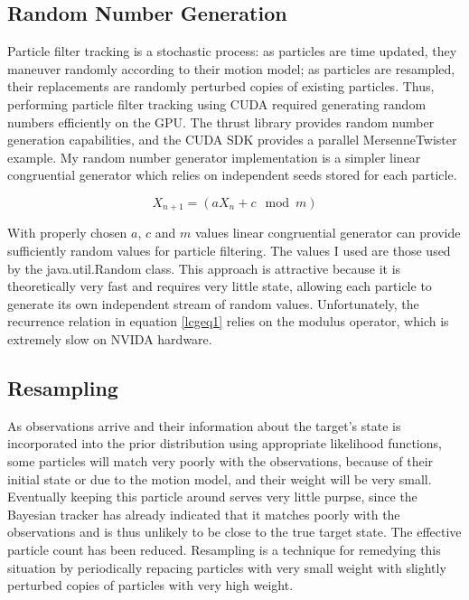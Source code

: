\documentclass{article}
\begin{document}
\subsection{Random Number Generation}
Particle filter tracking is a stochastic process: as particles are time updated, they maneuver randomly according to their motion model; as particles are resampled, their replacements are randomly perturbed copies of existing particles. Thus, performing particle filter tracking using CUDA required generating random numbers efficiently on the GPU. The thrust library provides random number generation capabilities, and the CUDA SDK provides a parallel MersenneTwister example. My random number generator implementation is a simpler linear congruential generator which relies on independent seeds stored for each particle.

\begin{equation}\label{lcgeq1}
X_{n+1}=(aX_{n}+c \mod m)
\end{equation}

With properly chosen \(a\), \(c\) and \(m\) values linear congruential generator can provide sufficiently random values for particle filtering\cite{lcg}. The values I used are those used by the java.util.Random class. This approach is attractive because it is theoretically very fast and requires very little state, allowing each particle to generate its own independent stream of random values. Unfortunately, the recurrence relation in equation \ref{lcgeq1} relies on the modulus operator, which is extremely slow on NVIDA hardware.\cite{oprc}

\subsection{Resampling}
As observations arrive and their information about the target's state is incorporated into the prior distribution using appropriate likelihood functions, some particles will match very poorly with the observations, because of their initial state or due to the motion model, and their weight will be very small. Eventually keeping this particle around serves very little purpse, since the Bayesian tracker has already indicated that it matches poorly with the observations and is thus unlikely to be close to the true target state. The effective particle count has been reduced. Resampling is a technique for remedying this situation by periodically repacing particles with very small weight with slightly perturbed copies of particles with very high weight.
\end{document}
